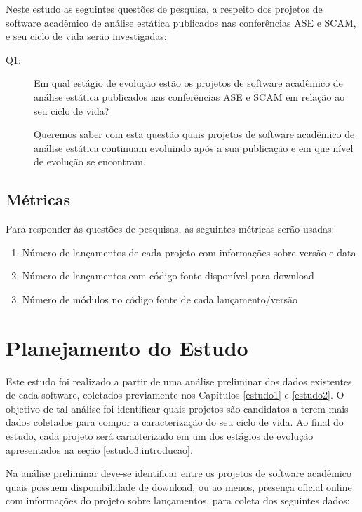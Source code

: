Neste estudo as seguintes questões de pesquisa, a respeito dos projetos de
software acadêmico de análise estática publicados nas conferências ASE e SCAM,
e seu ciclo de vida serão investigadas:

\newcommand{\EstudoTresQuestaoUm}{
  Em qual estágio de evolução estão os projetos de software acadêmico de
  análise estática publicados nas conferências ASE e SCAM em relação ao seu
  ciclo de vida?
}

\begin{description}
  \item [Q1:] \EstudoTresQuestaoUm

    Queremos saber com esta questão quais projetos de software acadêmico de
    análise estática continuam evoluindo após a sua publicação e em que nível
    de evolução se encontram.
\end{description}

\subsection{Métricas}

Para responder às questões de pesquisas, as seguintes métricas serão usadas:

\begin{enumerate}
  \item Número de lançamentos de cada projeto com informações sobre versão e data
  \item Número de lançamentos com código fonte disponível para download
  \item Número de módulos no código fonte de cada lançamento/versão
\end{enumerate}


\section{Planejamento do Estudo} \label{estudo3:planejamento} %

Este estudo foi realizado a partir de uma análise preliminar dos dados existentes
de cada software, coletados previamente nos Capítulos \ref{estudo1} e
\ref{estudo2}. O objetivo de tal análise foi identificar quais projetos são candidatos a
terem mais dados coletados para compor a caracterização do seu ciclo de vida. 
Ao final do estudo, cada projeto será caracterizado em um dos estágios
de evolução apresentados na seção \ref{estudo3:introducao}.

Na análise preliminar deve-se identificar entre os projetos de software
acadêmico quais possuem disponibilidade de download, ou ao menos, presença
oficial online com informações do projeto sobre lançamentos, para coleta
dos seguintes dados:

